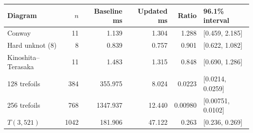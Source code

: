 \begin{tabular}{lrrrrl}
\toprule
Diagram & $n$ & Baseline ms & Updated ms & Ratio & 96.1\% interval \\
\midrule
Conway & 11 & 1.139 & 1.304 & 1.288 & [0.459, 2.185] \\
Hard unknot (8) & 8 & 0.839 & 0.757 & 0.901 & [0.622, 1.082] \\
Kinoshita--Terasaka & 11 & 1.483 & 1.315 & 0.848 & [0.690, 1.286] \\
128 trefoils & 384 & 355.975 & 8.024 & 0.0223 & [0.0214, 0.0259] \\
256 trefoils & 768 & 1347.937 & 12.440 & 0.00980 & [0.00751, 0.0102] \\
$T(3,521)$ & 1042 & 181.906 & 47.122 & 0.263 & [0.236, 0.269] \\
\bottomrule
\end{tabular}
